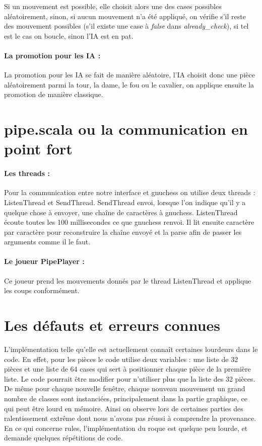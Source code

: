 \documentclass[a4paper]{article}
\begin{document}
Si un mouvement est possible, elle choisit alors une des cases possibles aléatoirement, sinon, si aucun mouvement n'a été appliqué, on vérifie s'il reste des mouvement possibles (s'il existe une case à \textit{false} dans \textit{already\_check}), si tel est le cas on boucle, sinon l'IA est en pat. 

\paragraph{La promotion pour les IA :}La promotion pour les IA se fait de manière aléatoire, l'IA choisit donc une pièce aléatoirement parmi la tour, la dame, le fou ou le cavalier, on applique ensuite la promotion de manière classique.

\section{pipe.scala ou la communication en point fort}

\paragraph{Les threads :}Pour la communication entre notre interface et gnuchess on utilise deux threads : ListenThread et SendThread. SendThread envoi, lorsque l'on indique qu'il y a quelque chose à envoyer, une chaîne de caractères à gnuchess. ListenThread écoute toutes les 100 millisecondes ce que gnuchess renvoi. Il lit ensuite caractère par caractère pour reconstruire la chaîne envoyé et la parse afin de passer les arguments comme il le faut. 

\paragraph{Le joueur PipePlayer :}Ce joueur prend les mouvements donnés par le thread ListenThread et applique les coups conformément. 

\section{Les défauts et erreurs connues}

L'implémentation telle qu'elle est actuellement connaît certaines lourdeurs dans le code. En effet, pour les pièces le code utilise deux variables : une liste de 32 pièces et une liste de 64 cases qui sert à positionner chaque pièce de la première liste. Le code pourrait être modifier pour n'utiliser plus que la liste des 32 pièces. \\

De même pour chaque nouvelle fenêtre, chaque nouveau mouvement un grand nombre de classes sont instanciées, principalement dans la partie graphique, ce qui peut être lourd en mémoire. Ainsi on observe lors de certaines parties des ralentissement extrême dont nous n'avons pas réussi à comprendre la provenance. \\ 

En ce qui concerne rules, l'implémentation du roque est quelque peu lourde, et demande quelques répétitions de code. \\
\end{document}
